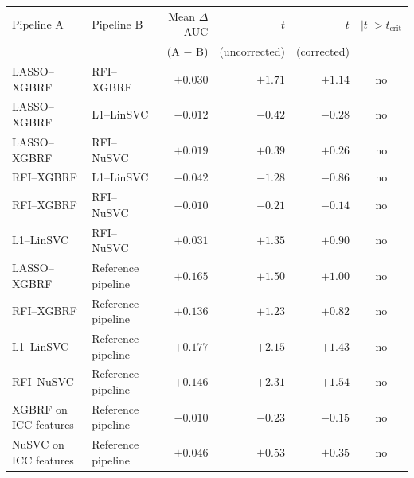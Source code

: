 {\scriptsize\setlength{\tabcolsep}{3pt}%
\begin{tabular}{llrrrc}
\toprule
Pipeline A & Pipeline B & Mean $\Delta$AUC & $t$ & $t$ & $|t| > t_{\text{crit}}$ \\
 &  & (A $-$ B) & (uncorrected) & (corrected) &  \\
\midrule
LASSO--XGBRF          & RFI--XGBRF         & $+0.030$ & $+1.71$ & $+1.14$ & no \\
LASSO--XGBRF          & L1--LinSVC         & $-0.012$ & $-0.42$ & $-0.28$ & no \\
LASSO--XGBRF          & RFI--NuSVC         & $+0.019$ & $+0.39$ & $+0.26$ & no \\
RFI--XGBRF            & L1--LinSVC         & $-0.042$ & $-1.28$ & $-0.86$ & no \\
RFI--XGBRF            & RFI--NuSVC         & $-0.010$ & $-0.21$ & $-0.14$ & no \\
L1--LinSVC            & RFI--NuSVC         & $+0.031$ & $+1.35$ & $+0.90$ & no \\
\midrule
LASSO--XGBRF          & Reference pipeline & $+0.165$ & $+1.50$ & $+1.00$ & no \\
RFI--XGBRF            & Reference pipeline & $+0.136$ & $+1.23$ & $+0.82$ & no \\
L1--LinSVC            & Reference pipeline & $+0.177$ & $+2.15$ & $+1.43$ & no \\
RFI--NuSVC            & Reference pipeline & $+0.146$ & $+2.31$ & $+1.54$ & no \\
XGBRF on ICC features & Reference pipeline & $-0.010$ & $-0.23$ & $-0.15$ & no \\
NuSVC on ICC features & Reference pipeline & $+0.046$ & $+0.53$ & $+0.35$ & no \\
\bottomrule
\end{tabular}}
